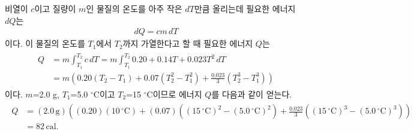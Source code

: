 \documentclass[floatfix,nofootinbib,superscriptaddress,fleqn]{revtex4-2}
\begin{document}
\vspace{1.cm}

비열이 $c$이고 질량이 $m$인 물질의 온도를 아주 작은 $dT$만큼 올리는데 필요한 에너지 $dQ$는
\begin{align}
 dQ = cm\,d T
\end{align}
이다. 이 물질의 온도를 $T_1$에서 $T_2$까지 가열한다고 할 때 필요한 에너지 $Q$는
\begin{align}
  \begin{split}
    Q &= m\int^{T_2}_{T_1}c\,dT
    = m \int^{T_2}_{T_1}0.20 +0.14T+0.023T^2\,dT  \\
    &= m\left( 0.20\left(T_2-T_1\right)+0.07\left(T_2^2-T_1^2\right)
    +\frac{0.023}{3}\left(T_2^3-T_1^3\right) \right)
  \end{split}
\end{align}
이다. $m$=2.0 g, $T_1$=5.0 $\mathrm{^\circ C}$이고 $T_2$=15 $\mathrm{^\circ C}$이므로
에너지 $Q$를 다음과 같이 얻는다.
\begin{align}
  \begin{split}
    Q &= (2.0\,\mathrm{g})\left(  
      (0.20)(10\,\mathrm{^\circ C})+(0.07)\left(
        (15\,\mathrm{^\circ C})^2-  
      (5.0\,\mathrm{^\circ C})^2\right)
      +\frac{0.023}{3}\left((15\,\mathrm{^\circ C})^3-  
      (5.0\,\mathrm{^\circ C})^3\right)
      \right) \\
      &= 82\,\mathrm{cal}.
    \end{split}
\end{align}
\vspace{1.cm}
\end{document}
